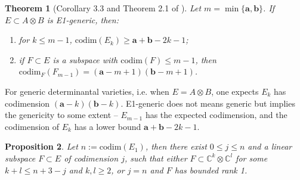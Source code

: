 \documentclass[10pt]{article} %
\newcommand{\aaa}{\mathbf{a}}
\newcommand{\bbb}{\mathbf{b}}
\newcommand{\ot}{\otimes}
\newtheorem{thm}{Theorem}
\newtheorem{prop}[thm]{Proposition}
\theoremstyle{definition}
\begin{document}
\begin{thm}[Corollary 3.3 and Theorem 2.1 of \cite{Eis88}]\label{1genthm}
Let $m=\min\{\aaa,\bbb\}$. If $E\subset A\otimes B$ is E1-generic, then:
\begin{enumerate}
    \item for $k\leq m-1$, $\mathrm{codim}(E_k)\geq \aaa+\bbb-2k-1$;
    \item if $F\subset E$ is a subspace with $\mathrm{codim}(F)\leq m-1$, then $\mathrm{codim}_F (F_{m-1})=(\aaa-m+1)(\bbb-m+1)$.
\end{enumerate}
\end{thm}

For generic determinantal varieties, i.e. when $E=A\ot B$, one expects $E_k$ has codimension $(\aaa-k)(\bbb-k)$. E1-generic does not means generic but implies the genericity to some extent -- $E_{m-1}$ has the expected codimension, and the codimension of $E_k$ has a lower bound $\aaa+\bbb-2k-1$.

\begin{prop}\label{segreprop}
Let $n:=\mathrm{codim}(E_1)$, then there exist $0\leq j\leq n$ and a linear subspace $F\subset E$ of codimension $j$, such that either $F\subset \mathbb{C}^{k}\otimes\mathbb{C}^{l}$ for some $k+l\leq n+3-j$ and $k,l\geq 2$, or $j=n$ and $F$ has bounded rank 1.
\end{prop}
\end{document}
